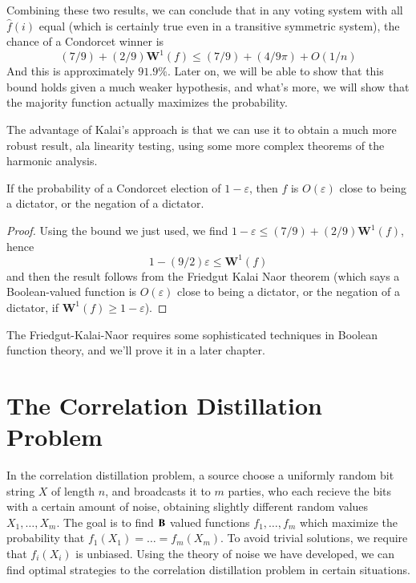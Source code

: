 Combining these two results, we can conclude that in any voting system with all $\widehat{f}(i)$ equal (which is certainly true even in a transitive symmetric system), the chance of a Condorcet winner is
%
\[ (7/9) + (2/9) \mathbf{W}^1(f) \leq (7/9) + (4/9\pi) + O(1/n) \]
%
And this is approximately $91.9\%$. Later on, we will be able to show that this bound holds given a much weaker hypothesis, and what's more, we will show that the majority function actually maximizes the probability.

The advantage of Kalai's approach is that we can use it to obtain a much more robust result, ala linearity testing, using some more complex theorems of the harmonic analysis.

\begin{theorem}
    If the probability of a Condorcet election of $1 - \varepsilon$, then $f$ is $O(\varepsilon)$ close to being a dictator, or the negation of a dictator.
\end{theorem}
\begin{proof}
    Using the bound we just used, we find $1 - \varepsilon \leq (7/9) + (2/9) \mathbf{W}^1(f)$, hence
    \[ 1 - (9/2) \varepsilon \leq \mathbf{W}^1(f) \]
    and then the result follows from the Friedgut Kalai Naor theorem (which says a Boolean-valued function is $O(\varepsilon)$ close to being a dictator, or the negation of a dictator, if $\mathbf{W}^1(f) \geq 1 - \varepsilon$).
\end{proof}

The Friedgut-Kalai-Naor requires some sophisticated techniques in Boolean function theory, and we'll prove it in a later chapter.

\section{The Correlation Distillation Problem}

In the correlation distillation problem, a source choose a uniformly random bit string $X$ of length $n$, and broadcasts it to $m$ parties, who each recieve the bits with a certain amount of noise, obtaining slightly different random values $X_1, \dots, X_m$. The goal is to find $\operatorname{\mathbf{B}}$ valued functions $f_1, \dots, f_m$ which maximize the probability that $f_1(X_1) = \dots = f_m(X_m)$. To avoid trivial solutions, we require that $f_i(X_i)$ is unbiased. Using the theory of noise we have developed, we can find optimal strategies to the correlation distillation problem in certain situations.

